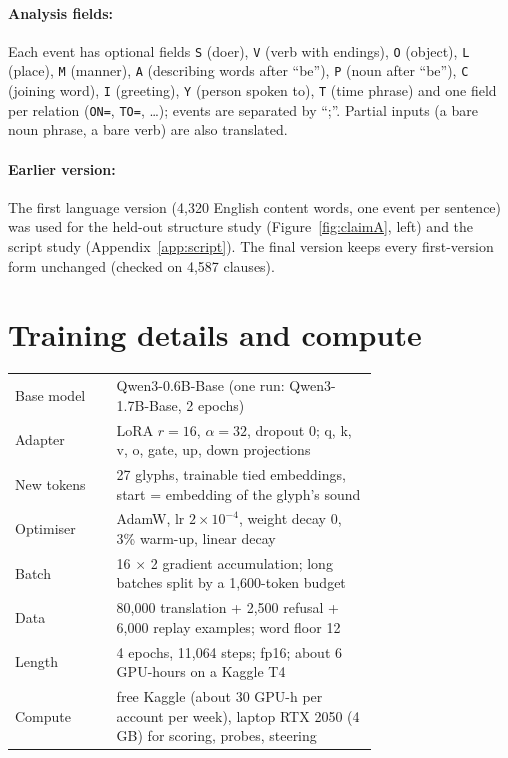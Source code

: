 \documentclass{article} %
\newcommand{\an}[1]{\texttt{#1}}
\begin{document}
\paragraph{Analysis fields:} Each event has optional fields \an{S} (doer), \an{V} (verb with endings), \an{O}
(object), \an{L} (place), \an{M} (manner), \an{A} (describing words after ``be''), \an{P} (noun after ``be''),
\an{C} (joining word), \an{I} (greeting), \an{Y} (person spoken to), \an{T} (time phrase) and one field per relation
(\an{ON=}, \an{TO=}, \ldots); events are separated by ``;''. Partial inputs (a bare noun phrase, a bare verb) are
also translated.

\paragraph{Earlier version:} The first language version (4,320 English content words, one event per sentence) was
used for the held-out structure study (Figure~\ref{fig:claimA}, left) and the script study (Appendix~\ref{app:script}).
The final version keeps every first-version form unchanged (checked on 4,587 clauses).

\section{Training details and compute}\label{app:training}

\begin{center}\small
\begin{tabular}{lp{0.72\linewidth}}
\toprule
Base model & Qwen3-0.6B-Base (one run: Qwen3-1.7B-Base, 2 epochs) \\
Adapter & LoRA $r=16$, $\alpha=32$, dropout 0; q, k, v, o, gate, up, down projections \\
New tokens & 27 glyphs, trainable tied embeddings, start = embedding of the glyph's sound \\
Optimiser & AdamW, lr $2\times10^{-4}$, weight decay 0, 3\% warm-up, linear decay \\
Batch & 16 $\times$ 2 gradient accumulation; long batches split by a 1,600-token budget \\
Data & 80,000 translation + 2,500 refusal + 6,000 replay examples; word floor 12 \\
Length & 4 epochs, 11,064 steps; fp16; about 6 GPU-hours on a Kaggle T4 \\
Compute & free Kaggle (about 30 GPU-h per account per week), laptop RTX 2050 (4 GB) for scoring, probes, steering \\
\bottomrule
\end{tabular}
\end{center}
\end{document}
